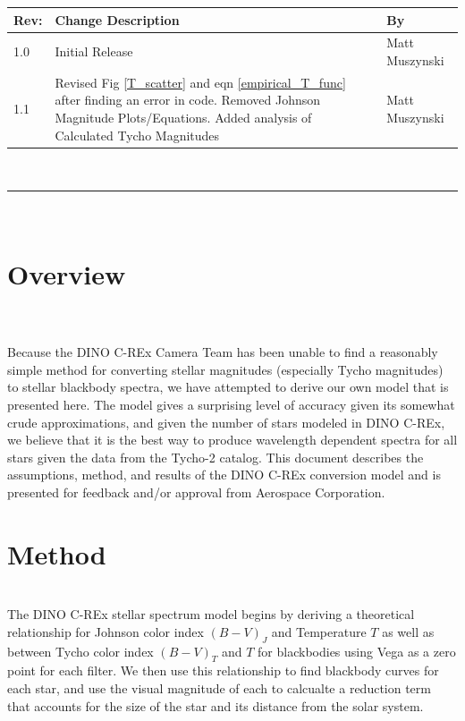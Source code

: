 \documentclass[]{DINOReportMemo}
\begin{document}
\makeCover
%
%
\pagestyle{empty}
{\renewcommand{\arraystretch}{2}
\noindent
\begin{longtable}{|p{0.5in}|p{4.5in}|p{1.14in}|}
\hline
{\bfseries Rev}: & {\bfseries Change Description} & {\bfseries By} \\
\hline
1.0 & Initial Release & Matt Muszynski \\ %
1.1 & Revised Fig \ref{T_scatter} and eqn \ref{empirical_T_func} after finding an error in code. Removed Johnson Magnitude Plots/Equations. Added analysis of Calculated Tycho Magnitudes & Matt Muszynski \\
\hline

\end{longtable}
}

\newpage
\setcounter{page}{1}
\pagestyle{fancy}

\tableofcontents
~\\ \hrule ~\\

\newpage
\section{Overview}\\\\
Because the DINO C-REx Camera Team has been unable to find a reasonably simple method for converting stellar magnitudes (especially Tycho magnitudes) to stellar blackbody spectra, we have attempted to derive our own model that is presented here. The model gives a surprising level of accuracy given its somewhat crude approximations, and given the number of stars modeled in DINO C-REx, we believe that it is the best way to produce wavelength dependent spectra for all stars given the data from the Tycho-2 catalog. This document describes the assumptions, method, and results of the DINO C-REx conversion model and is presented for feedback and/or approval from Aerospace Corporation.

\section{Method} \\

The DINO C-REx stellar spectrum model begins by deriving a theoretical relationship for Johnson color index $(B-V)_J$ and Temperature $T$ as well as between Tycho color index $(B-V)_T$ and $T$ for blackbodies using Vega as a zero point for each filter. We then use this relationship to find blackbody curves for each star, and use the visual magnitude of each to calcualte a reduction term that accounts for the size of the star and its distance from the solar system. 
\end{document}
